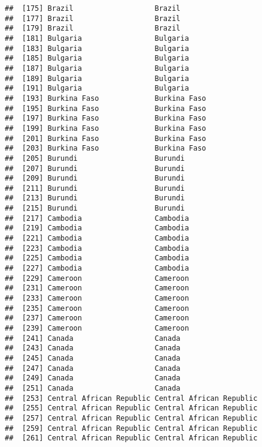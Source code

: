 \documentclass[]{article}
\begin{document}
\begin{verbatim}
##  [175] Brazil                   Brazil                  
##  [177] Brazil                   Brazil                  
##  [179] Brazil                   Brazil                  
##  [181] Bulgaria                 Bulgaria                
##  [183] Bulgaria                 Bulgaria                
##  [185] Bulgaria                 Bulgaria                
##  [187] Bulgaria                 Bulgaria                
##  [189] Bulgaria                 Bulgaria                
##  [191] Bulgaria                 Bulgaria                
##  [193] Burkina Faso             Burkina Faso            
##  [195] Burkina Faso             Burkina Faso            
##  [197] Burkina Faso             Burkina Faso            
##  [199] Burkina Faso             Burkina Faso            
##  [201] Burkina Faso             Burkina Faso            
##  [203] Burkina Faso             Burkina Faso            
##  [205] Burundi                  Burundi                 
##  [207] Burundi                  Burundi                 
##  [209] Burundi                  Burundi                 
##  [211] Burundi                  Burundi                 
##  [213] Burundi                  Burundi                 
##  [215] Burundi                  Burundi                 
##  [217] Cambodia                 Cambodia                
##  [219] Cambodia                 Cambodia                
##  [221] Cambodia                 Cambodia                
##  [223] Cambodia                 Cambodia                
##  [225] Cambodia                 Cambodia                
##  [227] Cambodia                 Cambodia                
##  [229] Cameroon                 Cameroon                
##  [231] Cameroon                 Cameroon                
##  [233] Cameroon                 Cameroon                
##  [235] Cameroon                 Cameroon                
##  [237] Cameroon                 Cameroon                
##  [239] Cameroon                 Cameroon                
##  [241] Canada                   Canada                  
##  [243] Canada                   Canada                  
##  [245] Canada                   Canada                  
##  [247] Canada                   Canada                  
##  [249] Canada                   Canada                  
##  [251] Canada                   Canada                  
##  [253] Central African Republic Central African Republic
##  [255] Central African Republic Central African Republic
##  [257] Central African Republic Central African Republic
##  [259] Central African Republic Central African Republic
##  [261] Central African Republic Central African Republic

\end{verbatim}
\end{document}
